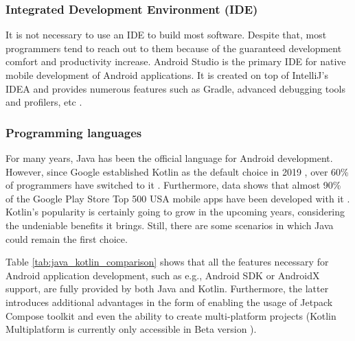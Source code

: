 \subsubsection*{Integrated Development Environment (IDE)}

It is not necessary to use an IDE to build most software. Despite that, most programmers tend to reach out to them because of the guaranteed development comfort and productivity increase. Android Studio is the primary IDE for native mobile development of Android applications. It is created on top of IntelliJ's IDEA and provides numerous features such as Gradle, advanced debugging tools and profilers, etc \cite{android_studio_intro}.

\subsubsection*{Programming languages}

For many years, Java has been the official language for Android development. However, since Google established Kotlin as the default choice in 2019 \cite{android_kotlin_first}, over 60\% of programmers have switched to it \cite{android_kotlin}. Furthermore, data shows that almost 90\% of the Google Play Store Top 500 USA mobile apps have been developed with it \cite{kc_kotlin_vs_java}. Kotlin's popularity is certainly going to grow in the upcoming years, considering the undeniable benefits it brings. Still, there are some scenarios in which Java could remain the first choice.

Table \ref{tab:java_kotlin_comparison} shows that all the features necessary for Android application development, such as e.g., Android SDK or AndroidX support, are fully provided by both Java and Kotlin. Furthermore, the latter introduces additional advantages in the form of enabling the usage of Jetpack Compose toolkit and even the ability to create multi-platform projects (Kotlin Multiplatform is currently only accessible in Beta version \cite{kotlin_multiplatform}).

